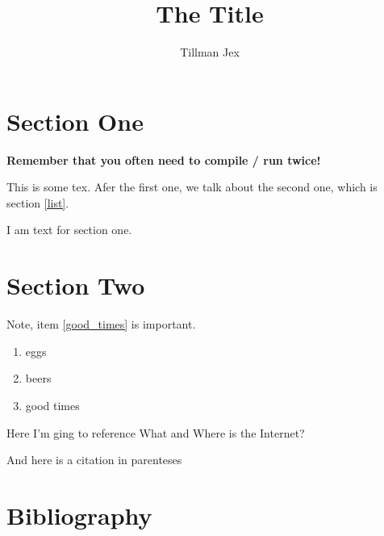 \documentclass{article}
\author{Tillman Jex}
\title{The Title}
\begin{document}
\maketitle


\section{Section One}

\textbf{Remember that you often need to compile / run twice!}

This is some tex. Afer the first one, we talk about the second one, which is 
section \ref{list}.

I am text for section one.

\section{Section Two\label{list}}

Note, item \ref{good_times} is important.

\begin{enumerate}
    \item{eggs}
    \item{beers}
    \item{good times \label{good_times}}
\end{enumerate}

Here I'm ging to reference What and Where is the Internet? \textcite{abbateWhatWhereInternet2017}

And here is a citation in parenteses \parencite{bridleNewDarkAge2018}

\section{Bibliography}

\printbibliography
\end{document}
